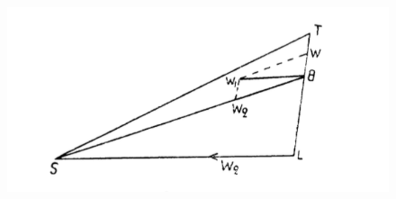 \documentclass[a4paper,12pt]{article}
\begin{document}
\begin{figure}[h]
	\begin{center}
		\includegraphics[scale = 1]{23.png}
		\caption{}
		\label{fig:23}
	\end{center}
\end{figure}
\end{document}
